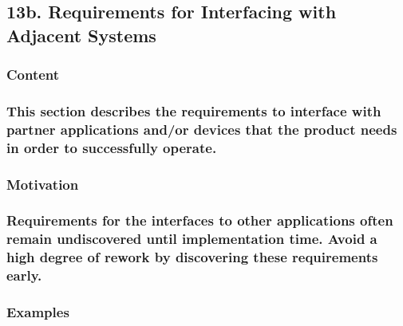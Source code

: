 \documentclass[
]{article}
\begin{document}
\hypertarget{b.-requirements-for-interfacing-with-adjacent-systems}{%
\subsection{13b. Requirements for Interfacing with Adjacent
Systems}\label{b.-requirements-for-interfacing-with-adjacent-systems}}

\hypertarget{content-46}{%
\subsubsection{Content}\label{content-46}}

\hypertarget{this-section-describes-the-requirements-to-interface-with-partner-applications-andor-devices-that-the-product-needs-in-order-to-successfully-operate.}{%
\subsubsection{\texorpdfstring{This section describes the requirements
to interface with partner applications and/or devices that the product
needs in order to successfully operate.
}{This section describes the requirements to interface with partner applications and/or devices that the product needs in order to successfully operate. }}\label{this-section-describes-the-requirements-to-interface-with-partner-applications-andor-devices-that-the-product-needs-in-order-to-successfully-operate.}}

\hypertarget{motivation-45}{%
\subsubsection{Motivation}\label{motivation-45}}

\hypertarget{requirements-for-the-interfaces-to-other-applications-often-remain-undiscovered-until-implementation-time.-avoid-a-high-degree-of-rework-by-discovering-these-requirements-early.}{%
\subsubsection{Requirements for the interfaces to other applications
often remain undiscovered until implementation time. Avoid a high degree
of rework by discovering these requirements
early.}\label{requirements-for-the-interfaces-to-other-applications-often-remain-undiscovered-until-implementation-time.-avoid-a-high-degree-of-rework-by-discovering-these-requirements-early.}}

\hypertarget{examples-30}{%
\subsubsection{Examples}\label{examples-30}}
\end{document}
